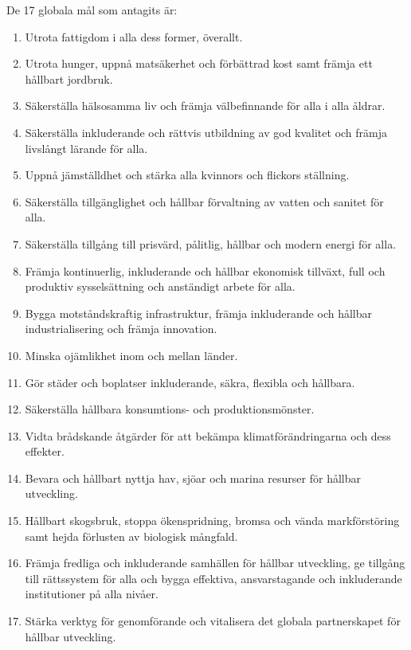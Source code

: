 \documentclass{report}
\begin{document}
 De 17 globala mål som antagits är: 
\begin{enumerate}
\item Utrota fattigdom i alla dess former, överallt.
\item Utrota hunger, uppnå matsäkerhet och förbättrad kost samt främja ett hållbart jordbruk.
\item Säkerställa hälsosamma liv och främja välbefinnande för alla i alla åldrar.
\item Säkerställa inkluderande och rättvis utbildning av god kvalitet och främja livslångt lärande för alla.
\item Uppnå jämställdhet och stärka alla kvinnors och flickors ställning.
\item Säkerställa tillgänglighet och hållbar förvaltning av vatten och sanitet för alla.
\item Säkerställa tillgång till prisvärd, pålitlig, hållbar och modern energi för alla.
\item Främja kontinuerlig, inkluderande och hållbar ekonomisk tillväxt, full och produktiv sysselsättning och anständigt arbete för alla.
\item Bygga motståndskraftig infrastruktur, främja inkluderande och hållbar industrialisering och främja innovation.
\item Minska ojämlikhet inom och mellan länder.
\item Gör städer och boplatser inkluderande, säkra, flexibla och hållbara.
\item Säkerställa hållbara konsumtions- och produktionsmönster.
\item Vidta brådskande åtgärder för att bekämpa klimatförändringarna och dess effekter.
\item Bevara och hållbart nyttja hav, sjöar och marina resurser för hållbar utveckling.
\item Hållbart skogsbruk, stoppa ökenspridning, bromsa och vända markförstöring samt hejda förlusten av biologisk mångfald.
\item Främja fredliga och inkluderande samhällen för hållbar utveckling, ge tillgång till rättssystem för alla och bygga effektiva, ansvarstagande och inkluderande institutioner på alla nivåer.
\item Stärka verktyg för genomförande och vitalisera det globala partnerskapet för hållbar utveckling. \cite{webKTH}
\end{enumerate}
\end{document}
